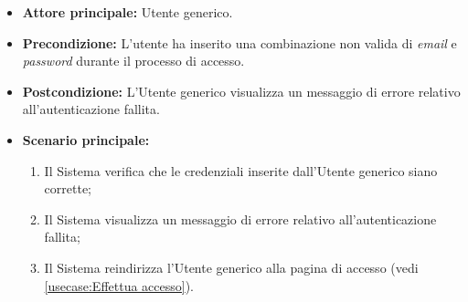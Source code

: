 \label{usecase:Accesso fallito}

\begin{itemize}
	\item \textbf{Attore principale:} Utente generico.
	\item \textbf{Precondizione:}
    L'utente ha inserito una combinazione non valida di \textit{email} e \textit{password} durante il processo di accesso.
	\item \textbf{Postcondizione:} L'Utente generico visualizza un messaggio di errore relativo all'autenticazione fallita.

	\item \textbf{Scenario principale:}
	\begin{enumerate}
        \item Il Sistema verifica che le credenziali inserite dall'Utente generico siano corrette;
        \item Il Sistema visualizza un messaggio di errore relativo all'autenticazione fallita;
        \item Il Sistema reindirizza l'Utente generico alla pagina di accesso (vedi \autoref{usecase:Effettua accesso}).
    \end{enumerate}
	
\end{itemize}